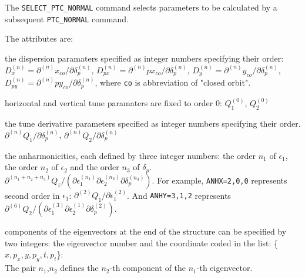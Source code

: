 The {\tt SELECT\_PTC\_NORMAL} command selects parameters to be 
calculated by a subsequent {\tt PTC\_NORMAL} command.


The attributes are: 
\begin{madlist}
   the dispersion paramaters specified as
  integer numbers specifying their order:  
  $D_x^{(n)} = \partial^{(n)} x_{co} / \partial \delta_p^{(n)}$, 
  $D_{px}^{(n)} = \partial^{(n)} px_{co} / \partial \delta_p^{(n)}$, 
  $D_y^{(n)} = \partial^{(n)} y_{co} / \partial \delta_p^{(n)}$, 
  $D_{py}^{(n)} = \partial^{(n)} py_{co} / \partial \delta_p^{(n)}$,
  where {\tt co} is abbreviation of "closed orbit".

   horizontal and vertical tune paramaters are fixed to
  order 0: $Q_1^{(0)}$,  $Q_2^{(0)}$
  
   the tune derivative parameters specified as
  integer numbers specifying their order. 
  $\partial^{(n)} Q_1 / \partial \delta_p^{(n)}$, 
  $\partial^{(n)} Q_2 / \partial \delta_{p}^{(n)}$
  
  
   the anharmonicities, each defined by three integer
  numbers: the order $n_1$ of $\epsilon_1$, the order $n_2$ of
  $\epsilon_2$ and the order $n_3$ of $\delta_p$.
  $\partial^{(n_1 + n_2 + n_3)} Q_z / (
  \partial\epsilon_1^{(n_1)} \partial\epsilon_2^{(n_2)}
  \partial\delta_p^{(n_3)})$.
  For example, {\tt ANHX=2,0,0} represents second order
  in $\epsilon_1$:  $\partial^{(2)} Q_1 / \partial \epsilon_1^{(2)}$. 
  And {\tt ANHY=3,1,2} represents $\partial^{(6)} Q_2 / (
  \partial\epsilon_1^{(3)} \partial\epsilon_2^{(1)}
  \partial\delta_p^{(2)})$.

   components of the eigenvectors at the end of the structure
  can be specified by two integers: the eigenvector number and the
  coordinate coded in the list: \{$x, p_x, y, p_y, t, p_t$\}: \\
  The pair $n_1$,$n_2$ defines the $n_2$-th component of
  the $n_1$-th eigenvector. 
  

\end{madlist}
